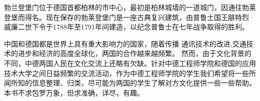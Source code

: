 \vspace*{3cm}
\begin{minipage}{\linewidth}
    \Huge\heiti{} \par
\end{minipage}

 \vspace*{3cm}

\par
勃兰登堡门位于德国首都柏林的市中心，最初是柏林城墙的一道城门，因通往勃莱登堡而得名。现在保存的勃莱登堡门是一座古典复兴建筑，由普鲁士国王腓特烈·威廉二世下令于1788年至1791年间建造，以纪念普鲁士在七年战争取得的胜利。
\cleardoublepage

\begin{minipage}{\linewidth}
\Huge\heiti{} \par
\end{minipage}

 \vspace*{3cm}
 中国和德国都是世界上具有重大影响力的国家，随着传播 通讯技术的改进,交通技术的进步和经济的高度全球化，两国的合作越来越频繁。 然而，由于文化背景的不同，中德两国人民在文化交流上还略有欠缺。针对中德工程师学院和德国的应用技术大学之间日益频繁的交流活动，作为中德工程师学院的学生我们希望将一些所闻所知的信息整理、归类，尽可能为两国的学生了解对方文化提供一些一些帮助。本书不求包罗万象，但求准确，详尽，有趣。

